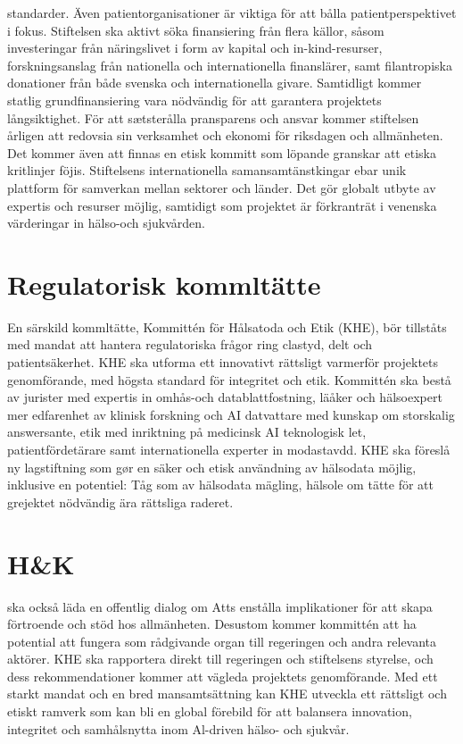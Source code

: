 {{{{{{{{{{{{{standarder. Även patientorganisationer är viktiga för att bålla patientperspektivet i fokus.
Stiftelsen ska aktivt söka finansiering från flera källor, såsom investeringar från näringslivet i form av kapital och in-kind-resurser, forskningsanslag från nationella och internationella finanslärer, samt filantropiska donationer från både svenska och internationella givare. Samtidligt kommer statlig grundfinansiering vara nödvändig för att garantera projektets långsiktighet.
För att sætsterålla pransparens och ansvar kommer stiftelsen årligen att redovsia sin verksamhet och ekonomi för riksdagen och allmänheten. Det kommer även att finnas en etisk kommitt som löpande granskar att etiska kritlinjer föjis. Stiftelsens internationella samansamtänstkingar ebar unik plattform för samverkan mellan sektorer och länder. Det gör globalt utbyte av expertis och resurser möjlig, samtidigt som projektet är förkranträt i venenska värderingar in hälso-och sjukvården.
\section*{Regulatorisk kommltätte}
En särskild kommltätte, Kommittén för Hålsatoda och Etik (KHE), bör tillståts med mandat att hantera regulatoriska frågor ring clastyd, delt och patientsäkerhet. KHE ska utforma ett innovativt rättsligt varmerför projektets genomförande, med högsta standard för integritet och etik. Kommittén ska bestå av jurister med expertis in omhås-och datablattfostning, läåker och hälsoexpert mer edfarenhet av klinisk forskning och AI datvattare med kunskap om storskalig answersante, etik med inriktning på medicinsk AI teknologisk let, patientfördetärare samt internationella experter in modastavdd. KHE ska föreslå ny lagstiftning som gør en säker och etisk användning av hälsodata möjlig, inklusive en potentiel: Tåg som av hälsodata mägling, hälsole om tätte för att grejektet nödvändig ära rättsliga raderet.
\section*{H\&K} ska också läda en offentlig dialog om Atts enstålla implikationer för att skapa förtroende och stöd hos allmänheten. Desustom kommer kommittén att ha potential att fungera som rådgivande organ till regeringen och andra relevanta aktörer. KHE ska rapportera direkt till regeringen och stiftelsens styrelse, och dess rekommendationer kommer att vägleda projektets genomförande. Med ett starkt mandat och en bred mansamtsättning kan KHE utveckla ett rättsligt och etiskt ramverk som kan bli en global förebild för att balansera innovation, integritet och samhålsnytta inom Al-driven hälso- och sjukvår.
}}}}}}}}}}}}}
